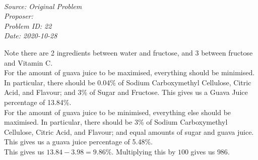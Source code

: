\SSbreak\\
\emph{Source: Original Problem}\\
\emph{Proposer: \Ptony}\\
\emph{Problem ID: 22}\\
\emph{Date: 2020-10-28}\\
\SSbreak

\bigskip

\begin{solution}\hfil\medskip

    Note there are 2 ingredients between water and fructose, and 3 between fructose and Vitamin C. \\

    For the amount of guava juice to be maximised, everything should be minimised. 
    In particular, there should be 0.04\% of Sodium Carboxymethyl Cellulose, Citric Acid, and Flavour; and 3\% of Sugar and Fructose. 
    This gives us a Guava Juice percentage of 13.84\%. \\

    For the amount of guava juice to be minimised, everything else should be maximised. 
    In particular, there should be 3\% of Sodium Carboxymethyl Cellulose, Citric Acid, and Flavour; and equal amounts of sugar and guava juice. 
    This gives us a guava juice percentage of 5.48\%. \\

    This gives us $13.84 - 3.98 = 9.86 \%$. 
    Multiplying this by $100$ gives us $\boxed{986}$. 
\end{solution}\bigskip